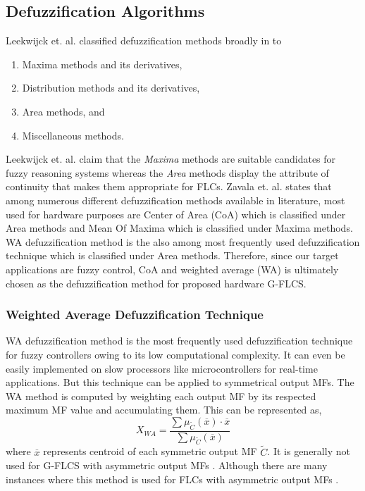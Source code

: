 \subsection{Defuzzification Algorithms}
Leekwijck et. al. \cite{Leekwijck1999} classified defuzzification methods broadly in to 
\begin{enumerate}
	\item Maxima methods and its derivatives,
	\item Distribution methods and its derivatives,
	\item Area methods, and
	\item Miscellaneous methods.
\end{enumerate}
Leekwijck et. al. claim that the \textit{Maxima} methods are suitable candidates for fuzzy reasoning systems whereas the \textit{Area} methods display the attribute of continuity that makes them appropriate for FLCs. Zavala et. al.\cite{Zavala2011} states that among numerous different defuzzification methods available in literature, most used for hardware purposes are Center of Area (CoA) which is classified under Area methods and Mean Of Maxima which is classified under Maxima methods. WA defuzzification method is the also among most frequently used defuzzification technique which is classified under Area methods. Therefore, since our target applications are fuzzy control, CoA and weighted average (WA) is ultimately chosen as the defuzzification method for proposed hardware G\hyp{}FLCS. 

\subsubsection{Weighted Average Defuzzification Technique}
WA defuzzification method is the most frequently used defuzzification technique for fuzzy controllers owing to its low computational complexity. It can even be easily implemented on slow processors like microcontrollers for real-time applications. But this technique can be applied to symmetrical output MFs. The WA method is computed by weighting each output MF by its respected maximum MF value and accumulating them. This can be represented as,
\[{X_{WA}} = \frac{{\sum {{\mu _{\widetilde C}}\left( {\overline x } \right) \cdot \overline x } }}{{\sum {{\mu _{\widetilde C}}\left( {\overline x } \right)} }}\]
where $ \overline x $ represents centroid of each symmetric output MF $ {\widetilde C} $. It is generally not used for G-FLCS with asymmetric output MFs \cite{Ross2010}. Although there are many instances where this method is used for FLCs with asymmetric output MFs \cite{Sugeno1985}.

